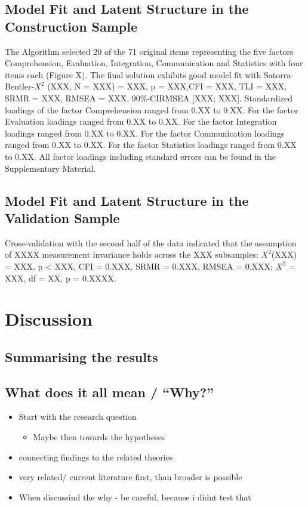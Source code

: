 \documentclass[
  12pt,
  a4paper,
  twoside]{article}
\providecommand{\tightlist}{%
  \setlength{\itemsep}{0pt}\setlength{\parskip}{0pt}}
\begin{document}
\subsection{Model Fit and Latent Structure in the Construction Sample}\label{model-fit-and-latent-structure-in-the-construction-sample}

The Algorithm selected 20 of the 71 original items representing the five factors Comprehension, Evaluation, Integration, Communication and Statistics with four items each (Figure X). The final solution exhibits good model fit with Satorra-Bentler-\(X^{2}\) (XXX, N = XXX) = XXX, p = XXX,CFI = XXX, TLI = XXX, SRMR = XXX, RMSEA = XXX, 90\%-CIRMSEA {[}XXX; XXX{]}.
Standardized loadings of the factor Comprehension ranged from 0.XX to 0.XX. For the factor Evaluation loadings ranged from 0.XX to 0.XX. For the factor Integration loadings ranged from 0.XX to 0.XX. For the factor Communication loadings ranged from 0.XX to 0.XX. For the factor Statistics loadings ranged from 0.XX to 0.XX.
All factor loadings including standard errors can be found in the Supplementary Material.

\subsection{Model Fit and Latent Structure in the Validation Sample}\label{model-fit-and-latent-structure-in-the-validation-sample}

Cross-validation with the second half of the data indicated that the assumption of XXXX measurement invariance holds across the XXX subsamples: \(X^{2}\)(XXX) = XXX, p \textless{} XXX, CFI = 0.XXX, SRMR = 0.XXX, RMSEA = 0.XXX; \(X^{2}\) = XXX, df = XX, p = 0.XXXX.

\section{Discussion}\label{discussion}

\subsection{Summarising the results}\label{summarising-the-results}

\subsection{What does it all mean / ``Why?''}\label{what-does-it-all-mean-why}

\begin{itemize}
\tightlist
\item
  Start with the research question

  \begin{itemize}
  \tightlist
  \item
    Maybe then towards the hypotheses
  \end{itemize}
\item
  connecting findings to the related theories
\item
  very related/ current literature first, than broader is possible
\item
  When discussind the why - be careful, because i didnt test that
\end{itemize}
\end{document}
